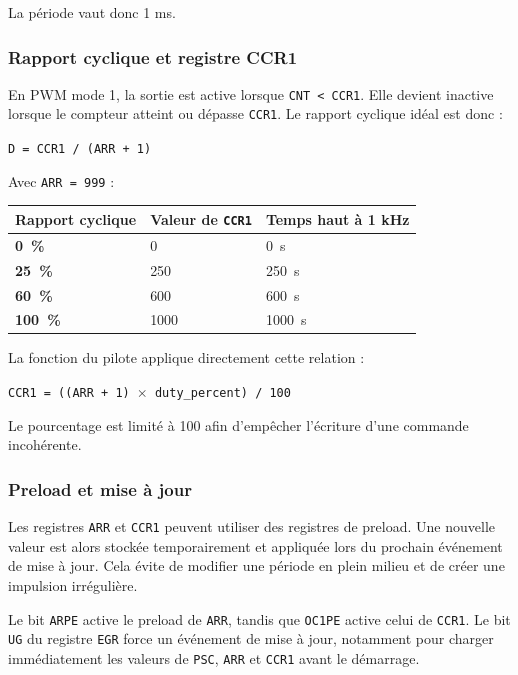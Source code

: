 \documentclass[11pt,a4paper]{article}
\begin{document}
	La période vaut donc 1 ms.
	
	\subsubsection*{Rapport cyclique et registre CCR1}
	
	En PWM mode 1, la sortie est active lorsque \texttt{CNT < CCR1}. Elle devient inactive lorsque le compteur atteint ou dépasse \texttt{CCR1}. Le rapport cyclique idéal est donc :
	
	\begin{center}
		\texttt{D = CCR1 / (ARR + 1)}
	\end{center}
	
	Avec \texttt{ARR = 999} :
	
	\begin{center}
		\begin{tabular}{>{\bfseries}p{4cm}p{4cm}p{4cm}}
			\toprule
			Rapport cyclique & Valeur de \texttt{CCR1} & Temps haut à 1 kHz \\
			\midrule
			0~\% & 0 & 0~\textmu s \\
			25~\% & 250 & 250~\textmu s \\
			60~\% & 600 & 600~\textmu s \\
			100~\% & 1000 & 1000~\textmu s \\
			\bottomrule
		\end{tabular}
	\end{center}
	
	La fonction du pilote applique directement cette relation :
	
	\begin{center}
		\texttt{CCR1 = ((ARR + 1) $\times$ duty\_percent) / 100}
	\end{center}
	
	Le pourcentage est limité à 100 afin d'empêcher l'écriture d'une commande incohérente.
	
	\subsubsection*{Preload et mise à jour}
	
	Les registres \texttt{ARR} et \texttt{CCR1} peuvent utiliser des registres de preload. Une nouvelle valeur est alors stockée temporairement et appliquée lors du prochain événement de mise à jour. Cela évite de modifier une période en plein milieu et de créer une impulsion irrégulière.
	
	Le bit \texttt{ARPE} active le preload de \texttt{ARR}, tandis que \texttt{OC1PE} active celui de \texttt{CCR1}. Le bit \texttt{UG} du registre \texttt{EGR} force un événement de mise à jour, notamment pour charger immédiatement les valeurs de \texttt{PSC}, \texttt{ARR} et \texttt{CCR1} avant le démarrage.
	
\end{document}
